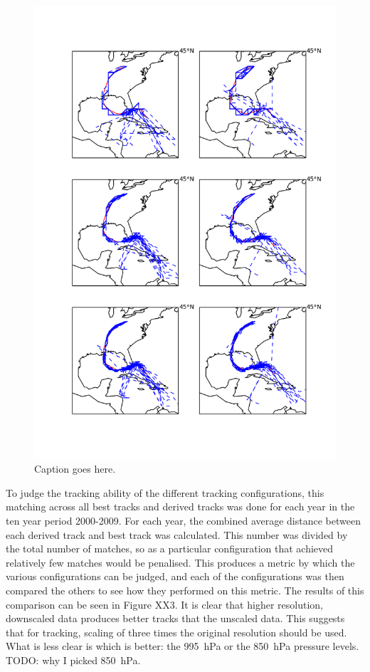 \documentclass[pdftex,12pt,a4paper]{report}
\begin{document}
\begin{figure}[hbp]
    \centering
    \includegraphics[width=\linewidth]{figures/katrina_six_tracking_configs}
    \caption{Caption goes here.}
    \label{fig:katrina_six_tracking_configs}
\end{figure}

To judge the tracking ability of the different tracking configurations, this matching across all
best tracks and derived tracks was done for each year in the ten year period 2000-2009. For each
year, the combined average distance between each derived track and best track was calculated. This
number was divided by the total number of matches, so as a particular configuration that achieved
relatively few matches would be penalised. This produces a metric by which the various
configurations can be judged, and each of the configurations was then compared the others to see how
they performed on this metric. The results of this comparison can be seen in Figure XX3. It is clear
that higher resolution, downscaled data produces better tracks that the unscaled data. This suggests
that for tracking, scaling of three times the original resolution should be used. What is less clear
is which is better: the \SI{995}{hPa} or the \SI{850}{hPa} pressure levels. TODO: why I picked
\SI{850}{hPa}.
\end{document}
